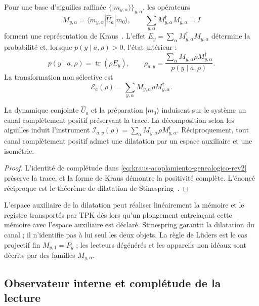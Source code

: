 Pour une base d’aiguilles raffinée \(\{|m_{y,\alpha}\rangle\}_{y,\alpha}\), les opérateurs
\begin{equation}
 M_{y,\alpha}=\langle m_{y,\alpha}|\widehat U_a|m_0\rangle,
 \qquad
 \sum_{y,\alpha} M_{y,\alpha}^\dagger M_{y,\alpha}=I
 \label{eq:kraus-acoplamiento-genealogico-rev2}
\end{equation}
forment une représentation de Kraus~\cite{Kraus1983}. L’effet \(E_y=\sum_\alpha M_{y,\alpha}^\dagger M_{y,\alpha}\) détermine la probabilité et, lorsque \(p(y\mid a,\rho)>0\), l’état ultérieur :
\begin{equation}
 p(y\mid a,\rho)=\operatorname{tr}(\rho E_y),
 \qquad
 \rho_{a,y}
 =\frac{\sum_\alpha M_{y,\alpha}\rho M_{y,\alpha}^\dagger}
 {p(y\mid a,\rho)}.
 \label{eq:instrumento-kraus-genealogico-rev2}
\end{equation}
La transformation non sélective est
\[
 \mathcal E_a(\rho)=
 \sum_{y,\alpha}M_{y,\alpha}\rho M_{y,\alpha}^\dagger.
\]

\begin{proposition}
\label{prop:acoplamiento-canal-reducido-rev2}
La dynamique conjointe \(\widehat U_a\) et la préparation \(|m_0\rangle\) induisent sur le système un canal complètement positif préservant la trace. La décomposition selon les aiguilles induit l’instrument \(\mathcal I_{a,y}(\rho)=
\sum_\alpha M_{y,\alpha}\rho M_{y,\alpha}^\dagger\). Réciproquement, tout canal complètement positif admet une dilatation par un espace auxiliaire et une isométrie.
\end{proposition}

\begin{proof}
L’identité de complétude dans \eqref{eq:kraus-acoplamiento-genealogico-rev2} préserve la trace, et la forme de Kraus démontre la positivité complète. L’énoncé réciproque est le théorème de dilatation de Stinespring~\cite{Stinespring1955}.
\end{proof}

L’espace auxiliaire de la dilatation peut réaliser linéairement la mémoire et le registre transportés par TPK dès lors qu’un plongement entrelaçant cette mémoire avec l’espace auxiliaire est déclaré. Stinespring garantit la dilatation du canal ; il n’identifie pas à lui seul les deux objets. La règle de Lüders est le cas projectif fin \(M_{y,1}=P_y\) ; les lecteurs dégénérés et les appareils non idéaux sont décrits par des familles \(M_{y,\alpha}\).

\subsection{Observateur interne et complétude de la lecture}

